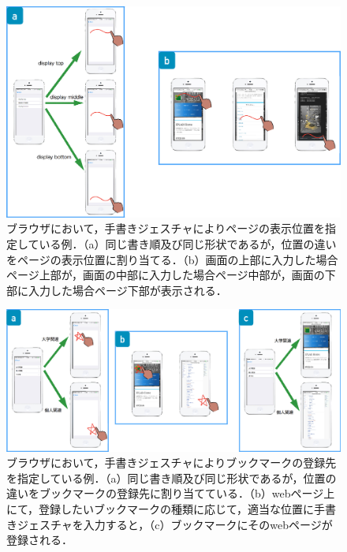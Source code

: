 \begin{figure} [h!]
	\begin{center}
		\includegraphics [width=1.0\hsize ]{img/phone_web.eps}
	\end{center}
	\caption{ブラウザにおいて，手書きジェスチャによりページの表示位置を指定している例．（a）同じ書き順及び同じ形状であるが，位置の違いをページの表示位置に割り当てる．（b）画面の上部に入力した場合ページ上部が，画面の中部に入力した場合ページ中部が，画面の下部に入力した場合ページ下部が表示される．}
	\label{fig:phone_web}
\end{figure}

\begin{figure} [h!]
	\begin{center}
		\includegraphics [width=1.0\hsize ]{img/phone_bookmark.eps}
	\end{center}
	\caption{ブラウザにおいて，手書きジェスチャによりブックマークの登録先を指定している例．（a）同じ書き順及び同じ形状であるが，位置の違いをブックマークの登録先に割り当てている．（b）webページ上にて，登録したいブックマークの種類に応じて，適当な位置に手書きジェスチャを入力すると，（c）ブックマークにそのwebページが登録される．}
	\label{fig:phone_bookmark}
\end{figure}

